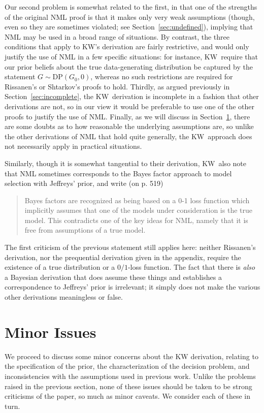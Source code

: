 \documentclass[authoryear]{elsarticle}
\newcommand{\kw}{KW}
\begin{document}
Our second problem is somewhat related to the first, in that one of
the strengths of the original NML proof is that it makes only very weak
assumptions (though, even so they are sometimes violated; see
Section~\ref{sec:undefined}), implying that NML may be used in a
broad range of situations. By contrast, the three conditions that apply to
\kw's derivation are fairly restrictive, and would only justify the use
of NML in a few specific situations: for instance, \kw\ require that
our prior beliefs about the true
data-generating distribution be captured by the statement
$G \sim \mbox{DP}(G_0, 0)$, whereas no such restrictions are
required for Rissanen's or Shtarkov's proofs to hold.
 Thirdly, as argued previously in Section~\ref{sec:incomplete}, the
 \kw\  derivation is incomplete in a fashion that other derivations are
 not, so in our view it would be preferable to use one of the other
 proofs to justify the use of NML. Finally, as we will discuss in
 Section~\ref{sec:minor},  there are some doubts as to how
 reasonable the underlying assumptions are, so unlike the other
 derivations of NML that hold quite generally, the \kw\ approach
 does not necessarily apply in practical situations.

Similarly, though it is somewhat tangential to their derivation, \kw\ also
note that NML sometimes corresponds to the Bayes factor
approach to model selection with Jeffreys' prior, and write (on p. 519)
\begin{quote}
Bayes factors are recognized as being based on a 0-1 loss function
which implicitly assumes that one of the models under consideration is
the true model. This contradicts one of the key ideas for
NML, namely that it is free from assumptions of a true model.
\end{quote}
The first criticism of the previous statement still applies here:
neither Rissanen's derivation, nor the prequential derivation given in
the appendix, require the existence of a true distribution or a $0/1$-loss
function. The fact that there is {\it also} a Bayesian derivation
that does assume these things and establishes a correspondence to
Jeffreys' prior is irrelevant; it simply does not make the various other
derivations meaningless or false.


\section{Minor Issues}
\label{sec:minor}

We proceed to discuss some minor concerns about the KW derivation,
relating to the specification of the prior, the characterization
of the decision problem, and inconsistencies with the assumptions used
in previous work. Unlike the problems raised in the previous section,
none of these issues should be taken to be strong criticisms of the
paper, so much as minor caveats. We consider each of these in turn.
\end{document}
